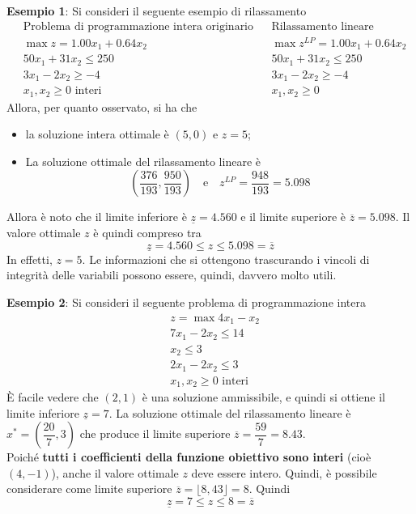 \documentclass[a4paper]{extarticle}
\begin{document}
\vspace{2em}
\noindent
\textbf{Esempio 1}: Si consideri il seguente esempio di rilassamento
\begin{align*}
    & \text{Problema di programmazione intera originario} & & \text{Rilassamento lineare}\\
    &\max z = 1.00x_1 + 0.64x_2 && \max z^{LP} = 1.00x_1 + 0.64x_2\\
    &50x_1 + 31x_2 \leq 250 && 50x_1 + 31x_2 \leq 250\\
    &3x_1 - 2x_2 \geq -4 && 3x_1 - 2x_2 \geq -4\\
    &x_1, x_2 \geq 0 \text{ interi} &&x_1, x_2 \geq 0
\end{align*}
Allora, per quanto osservato, si ha che
\begin{itemize}
    \item la soluzione intera ottimale è $(5, 0)$ e $z = 5$;
    \item La soluzione ottimale del rilassamento lineare è \[\left(\dfrac{376}{193}, \dfrac{950}{193}\right) \hspace{1em} \text{e} \hspace{1em} z^{LP} = \dfrac{948}{193} = 5.098\]
\end{itemize}
Allora è noto che il limite inferiore è $\underline{z} = 4.560$ e il limite superiore è $\overline{z}=5.098$. Il valore ottimale $z$ è quindi compreso tra
\[\underline{z} = 4.560 \leq z \leq 5.098 = \overline{z}\]
In effetti, $z = 5$. Le informazioni che si ottengono trascurando i vincoli di integrità delle variabili possono essere, quindi, davvero molto utili.

\vspace{2em}
\textbf{Esempio 2}: Si consideri il seguente problema di programmazione intera
\begin{align*}
    &z=\max 4x_1 - x_2\\
    &7x_1 - 2x_2 \leq 14\\
    &x_2 \leq 3\\
    &2x_1 - 2x_2 \leq 3\\
    &x_1, x_2 \geq 0 \text{ interi}
\end{align*}
È facile vedere che $(2,1)$ è una soluzione ammissibile, e quindi si ottiene il limite inferiore $\underline{z}=7$. La soluzione ottimale del rilassamento lineare è $x^* = \left(\dfrac{20}{7},3\right)$ che produce il limite superiore $\overline{z} = \dfrac{59}{7} = 8.43$.\\
Poiché \textbf{tutti i coefficienti della funzione obiettivo sono interi} (cioè $(4,-1)$), anche il valore ottimale $z$ deve essere intero. Quindi, è possibile considerare come limite superiore $\overline{z} = \lfloor 8,43 \rfloor = 8$. Quindi
\[\underline{z}=7 \leq z \leq 8 = \overline{z}\]
\end{document}
